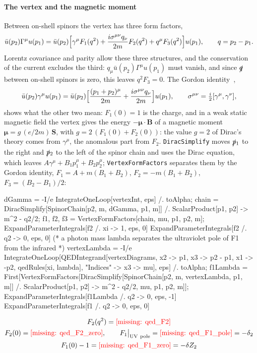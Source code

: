 \documentclass[11pt,a4paper]{article}
\newcommand{\formula}[1]{\IfFileExists{figures/formula_#1.tex}{}{\text{\textcolor{red}{[missing: \detokenize{#1}]}}}}
\newcommand{\pkg}[1]{\texttt{#1}}
\begin{document}
\paragraph{The vertex and the magnetic moment} Between on-shell spinors the vertex has three form factors,
\[
\bar u(p_2)\Gamma^\mu u(p_1)=\bar u(p_2)\Bigl[\gamma^\mu F_1(q^2)+\frac{i\sigma^{\mu\nu}q_\nu}{2m}F_2(q^2)+q^\mu F_3(q^2)\Bigr]u(p_1),
\qquad q=p_2-p_1.
\]
Lorentz covariance and parity allow these three structures, and the conservation of the current excludes the third:
$q_\mu\bar u(p_2)\Gamma^\mu u(p_1)$ must vanish, and since $\slashed{q}$ between on-shell spinors is zero, this leaves
$q^2F_3=0$. The Gordon identity~\cite[section~6.2]{PeskinSchroeder},
\[
\bar u(p_2)\gamma^\mu u(p_1)=\bar u(p_2)\Bigl[\frac{(p_1+p_2)^\mu}{2m}+\frac{i\sigma^{\mu\nu}q_\nu}{2m}\Bigr]u(p_1),\qquad
\sigma^{\mu\nu}=\tfrac i2[\gamma^\mu,\gamma^\nu],
\]
shows what the other two mean: $F_1(0)=1$ is the charge, and in a weak static magnetic field the vertex gives the energy
$-\boldsymbol\mu\cdot\mathbf B$ of a magnetic moment $\boldsymbol\mu=g\,(e/2m)\,\mathbf S$, with $g=2\,(F_1(0)+F_2(0))$: the
value $g=2$ of Dirac's theory comes from $\gamma^\mu$, the anomalous part from $F_2$. \pkg{DiracSimplify} moves
$\slashed{p}{}_1$ to the right and $\slashed{p}{}_2$ to the left of the spinor chain and uses the Dirac equation, which
leaves $A\gamma^\mu+B_1p_1^\mu+B_2p_2^\mu$; \pkg{VertexFormFactors} separates them by the Gordon identity,
$F_1=A+m(B_1+B_2)$, $F_2=-m(B_1+B_2)$, $F_3=(B_2-B_1)/2$:
\begin{code}
dGamma = -I/e IntegrateOneLoop[vertexInt, eps] /. toAlpha;
chain = DiracSimplify[SpinorChain[{p2, m}, dGamma, {p1, m}]] /.
    ScalarProduct[p1, p2] -> m^2 - q2/2;
{f1, f2, f3} = VertexFormFactors[chain, mu, {p1, p2, m}];
ExpandParameterIntegrals[f2 /. xi -> 1, eps, 0]
ExpandParameterIntegrals[f2 /. q2 -> 0, eps, 0]
(* a photon mass lambda separates the ultraviolet pole of F1 from the infrared *)
vertexLambda = -I/e IntegrateOneLoop[QEDIntegrand[vertexDiagrams, {x2 -> p1,
    x3 -> p2 - p1, x1 -> -p2}, qedRules[xi, lambda], "Indices" -> {x3 -> mu}], eps] /.
    toAlpha;
f1Lambda = First[VertexFormFactors[DiracSimplify[SpinorChain[{p2, m}, vertexLambda,
    {p1, m}]] /. ScalarProduct[p1, p2] -> m^2 - q2/2, mu, {p1, p2, m}]];
ExpandParameterIntegrals[f1Lambda /. q2 -> 0, eps, -1]
ExpandParameterIntegrals[f1 /. q2 -> 0, eps, 0]
\end{code}
\begin{outputbox}
\vspace{-6pt}
\begin{gather*}
F_2(q^2)=\formula{qed_F2}\\
F_2(0)=\formula{qed_F2_zero},\qquad F_1\big|_{\rm UV\ pole}=\formula{qed_F1_pole}=-\delta_2\\
F_1(0)-1=\formula{qed_F1_zero}=-\delta Z_2
\end{gather*}
\end{outputbox}
\end{document}
